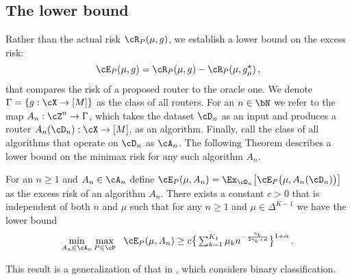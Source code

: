 \subsection{The lower bound} 
Rather than the actual risk $\cR_P(\mu, g)$, we establish a lower bound on the excess risk:
\begin{equation}\label{eq:excess-risk}
    \cE_P(\mu, g) = \cR_P(\mu, g) - \cR_P(\mu, g_\mu^\star)\,,
\end{equation} that compares the risk of a proposed router to the oracle one. We denote $\Gamma = \{g: \cX \to [M]\}$ as the class of all routers. For an $n \in \bN$ we refer to the map $A_n: \cZ^n \to \Gamma$, which takes the dataset $\cD_n $ as an input and produces a router $A_n(\cD_n): \cX \to [M]$, as an algorithm. Finally, call the class of all algorithms that operate on $\cD_n$ as $\cA_n$. The following Theorem describes a lower bound on the minimax risk for any such algorithm $A_n$. 
\begin{theorem}\label{thm:lower-bound}
    For an $n \ge 1$  and $A_n \in \cA_n$ define  $\cE_P(\mu, A_n) = \Ex_{\cD_n}\big[\cE_P\big(\mu, A_n(\cD_n)\big)\big]$ as the excess risk of an algorithm $A_n$. There exists a constant $c> 0$ that is independent of both $n$ and $\mu$ such that for any $n\ge 1$ and $\mu\in \Delta^{K-1}$ we have the lower bound
    \begin{equation}\label{eq:lower-bound}
      \textstyle  \min\limits_{A_n \in \cA_n} \max\limits_{P \in \cP} ~~ \cE_P(\mu, A_n) \ge c \big \{\sum_{k = 1}^{K_1} \mu_k n^{- \frac{\gamma_k}{2\gamma_k + d}}\big\}^{1+\alpha} \,.
    \end{equation}
\end{theorem} 
This result is a generalization of that in \citet{audibert2007Fast}, which considers binary classification. 
